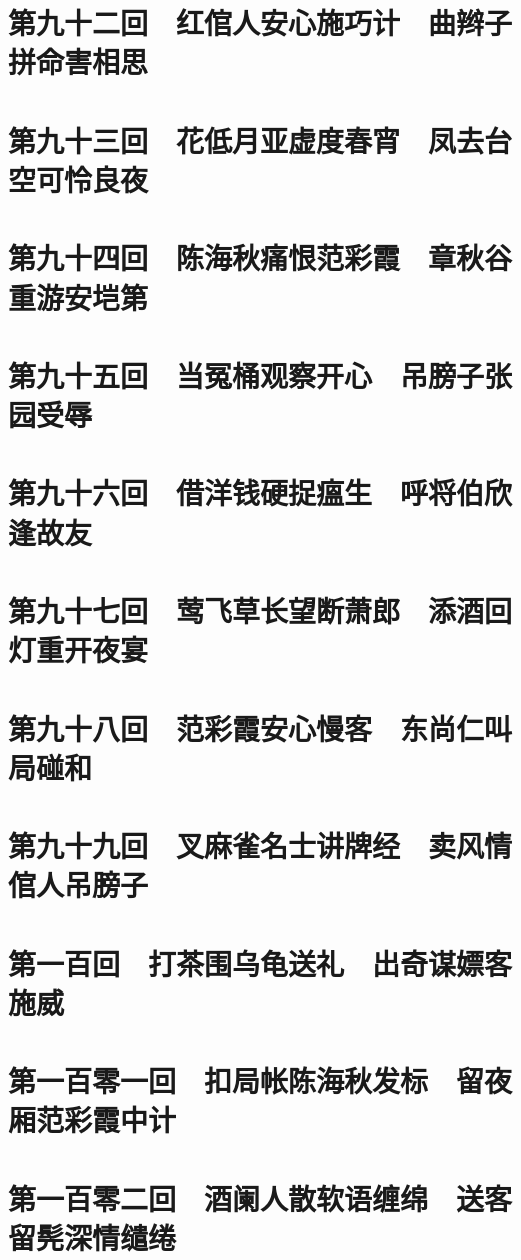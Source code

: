 \documentclass[12pt,UTF8]{ctexbook}
\begin{document}
\chapter{第九十二回　红倌人安心施巧计　曲辫子拼命害相思}

\chapter{第九十三回　花低月亚虚度春宵　凤去台空可怜良夜}

\chapter{第九十四回　陈海秋痛恨范彩霞　章秋谷重游安垲第}

\chapter{第九十五回　当冤桶观察开心　吊膀子张园受辱}
\chapter{第九十六回　借洋钱硬捉瘟生　呼将伯欣逢故友}

\chapter{第九十七回　莺飞草长望断萧郎　添酒回灯重开夜宴}

\chapter{第九十八回　范彩霞安心慢客　东尚仁叫局碰和}

\chapter{第九十九回　叉麻雀名士讲牌经　卖风情倌人吊膀子}

\chapter{第一百回　打茶围乌龟送礼　出奇谋嫖客施威}

\chapter{第一百零一回　扣局帐陈海秋发标　留夜厢范彩霞中计}

\chapter{第一百零二回　酒阑人散软语缠绵　送客留髡深情缱绻}
\end{document}
